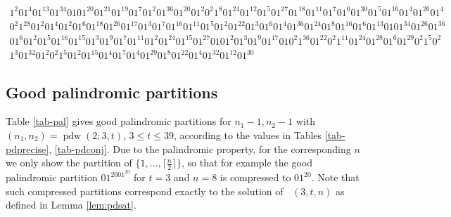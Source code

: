 \documentclass[final,3p,times]{elsarticle}
\theoremstyle{definition}
\newcommand{\set}[1]{\{#1\}}
\renewcommand{\leq}{\le} %
\newcommand{\ceil}[1]{\lceil #1 \rceil}
\DeclareMathOperator{\vdwpd}{pdw}
\DeclareMathOperator{\Fpd}{\mathit{F}^{pd}}
\begin{document}
\begin{appendix}
\begin{gather*}
  1^{2}01^{4}01^{13}01^{34}0101^{20}01^{21}01^{19}01^{7}01^{2}01^{36}01^{20}01^{2}0^{2}1^{8}01^{24}01^{12}01^{5}01^{27}01^{18}01^{11}01^{7}01^{6}01^{30}01^{5}01^{16}01^{4}01^{26}01^{4}\\
  0^{2}1^{28}01^{2}01^{4}01^{2}01^{6}01^{18}01^{26}01^{17}01^{3}01^{7}01^{16}01^{11}01^{5}01^{2}01^{22}01^{3}01^{6}01^{4}01^{36}01^{24}01^{8}01^{16}01^{6}01^{13}0101^{34}01^{26}01^{36}\\
  01^{6}01^{2}01^{5}01^{16}01^{15}01^{3}01^{9}01^{7}01^{11}01^{2}01^{24}01^{15}01^{27}0101^{2}01^{3}01^{9}01^{17}010^{2}1^{36}01^{22}0^{2}1^{11}01^{24}01^{28}01^{6}01^{29}0^{2}1^{5}0^{2}\\
  1^{3}01^{32}01^{2}0^{2}1^{5}01^{2}01^{15}01^{4}01^{7}01^{4}01^{29}01^{8}01^{22}01^{4}01^{32}01^{12}01^{30}
\end{gather*}

\normalsize


\subsection{Good palindromic partitions}
\label{sec:goodpp}

Table \ref{tab-pal} gives good palindromic partitions for $n_1-1, n_2 - 1$ with $(n_1,n_2) = \vdwpd(2;3,t)$, $3 \leq t \leq 39$, according to the values in Tables \ref{tab-pdprecise}, \ref{tab-pdconj}. Due to the palindromic property, for the corresponding $n$ we only show the partition of $\set{1,\dots,\ceil{\frac n2}}$, so that for example the good palindromic partition $01^2001^20$ for $t=3$ and $n=8$ is compressed to $01^20$. Note that such compressed partitions correspond exactly to the solution of $\Fpd(3,t,n)$ as defined in Lemma \ref{lem:pdsat}.


\end{appendix}
\end{document}
